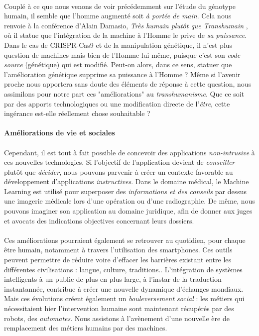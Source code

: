 \paragraph{} Couplé à ce que nous venons de voir précédemment sur l'étude du génotype humain, il semble que
l'homme augmenté soit \emph{à portée de main}. Cela nous renvoie à la conférence d'Alain Damasio, \emph{Très humain
plutôt que Transhumain} \cite{Damasio2}, où il statue que l'intégration de la machine à l'Homme le prive de \emph{sa 
puissance}. Dans le cas de CRISPR-Cas9 et de la manipulation génétique, il n'est plus question de machines
mais bien de l'Homme lui-même, puisque c'est son \emph{code source} (génétique) qui est modifié. Peut-on alors, dans ce sens,
statuer que l'amélioration génétique supprime sa puissance à l'Homme ? Même si l'avenir proche nous apportera sans doute
des éléments de réponse à cette question, nous assimilons pour notre part ces "améliorations" au \emph{transhumanisme}.
Que ce soit par des apports technologiques ou une modification directe de l'\emph{être}, cette ingérance est-elle
réellement chose souhaitable ?

\paragraph{Améliorations de vie et sociales}

\paragraph{} Cependant, il est tout à fait possible de concevoir des applications \emph{non-intrusive} à ces
nouvelles technologies. Si l'objectif de l'application devient de \emph{conseiller} plutôt que \emph{décider},
nous pouvons parvenir à créer un contexte favorable au développement d'applications \emph{instructives}. Dans le
domaine médical, le Machine Learning est utilisé pour superposer des \emph{informations et des conseils} par dessus
une imagerie médicale lors d'une opération ou d'une radiographie. De même, nous pouvons imaginer son 
application au domaine juridique, afin de donner aux juges et avocats des indications objectives concernant leurs
dossiers.

\paragraph{} Ces améliorations pourraient également se retrouver au quotidien, pour chaque être humain, notamment
à travers l'utilisation des smartphones. Ces outils peuvent permettre de réduire voire d'effacer les barrières 
existant entre les différentes civilisations : langue, culture, traditions.. L'intégration de systèmes intelligents 
à un public de plus en plus large, à l'instar de la traduction instantannée, contribue à créer une nouvelle
dynamique d'échanges mondiaux. Mais ces évolutions créent également un \emph{bouleversement social} : les métiers
qui nécessitaient hier l'intervention humaine sont maintenant récupérés par des robots, des \emph{automates}.
Nous assistons à l'avènement d'une nouvelle ère de remplacement des métiers humains par des machines.

